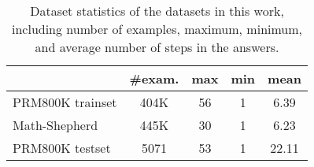\begin{table}[t] \small
\centering
\begin{tabular}{lcccc}
\toprule
& \#exam. & max & min & mean\\ \hline
PRM800K trainset & 404K    & 56        & 1         & \phantom{0}6.39       \\
Math-Shepherd   & 445K    & 30        & 1         & \phantom{0}6.23       \\
PRM800K testset  & 5071    & 53        & 1         & 22.11     \\
\bottomrule
\end{tabular}
\caption{
Dataset statistics of the datasets in this work, including number of examples, maximum, minimum, and average number of steps in the answers. 
}
\label{tab:data_stat}
\end{table}